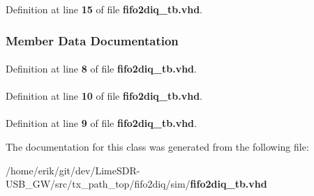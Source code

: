 Definition at line {\bf 15} of file {\bf fifo2diq\+\_\+tb.\+vhd}.



\subsubsection{Member Data Documentation}
\paragraph[{ieee}]{\hspace{0.3cm}{\ttfamily [Library]}}\label{classfifo2diq__tb_a0a6af6eef40212dbaf130d57ce711256}


Definition at line {\bf 8} of file {\bf fifo2diq\+\_\+tb.\+vhd}.

\paragraph[{numeric\+\_\+std}]{\hspace{0.3cm}{\ttfamily [Package]}}\label{classfifo2diq__tb_a2edc34402b573437d5f25fa90ba4013e}


Definition at line {\bf 10} of file {\bf fifo2diq\+\_\+tb.\+vhd}.

\paragraph[{std\+\_\+logic\+\_\+1164}]{\hspace{0.3cm}{\ttfamily [Package]}}\label{classfifo2diq__tb_acd03516902501cd1c7296a98e22c6fcb}


Definition at line {\bf 9} of file {\bf fifo2diq\+\_\+tb.\+vhd}.



The documentation for this class was generated from the following file\+:\begin{DoxyCompactItemize}
\item 
/home/erik/git/dev/\+Lime\+S\+D\+R-\/\+U\+S\+B\+\_\+\+G\+W/src/tx\+\_\+path\+\_\+top/fifo2diq/sim/{\bf fifo2diq\+\_\+tb.\+vhd}\end{DoxyCompactItemize}
